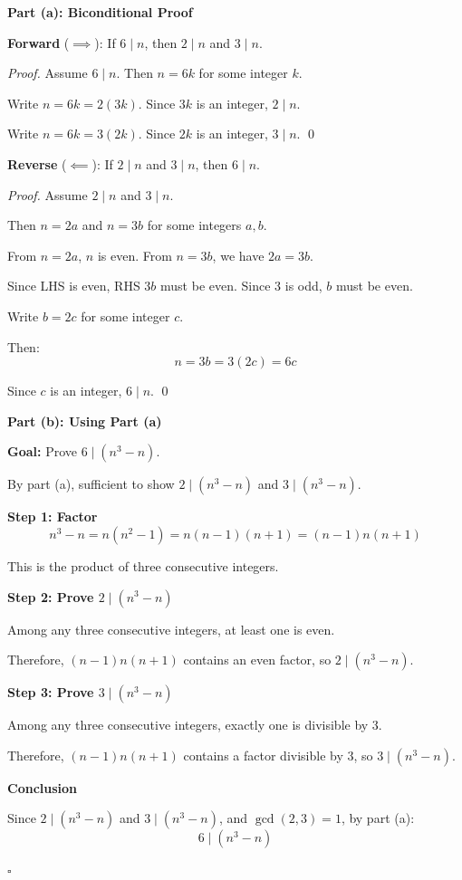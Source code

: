 \begin{solution}
\textbf{Part (a): Biconditional Proof}

\textbf{Forward} ($\implies$): If $6 \mid n$, then $2 \mid n$ and $3 \mid n$.

\begin{proof}
Assume $6 \mid n$. Then $n = 6k$ for some integer $k$.

Write $n = 6k = 2(3k)$. Since $3k$ is an integer, $2 \mid n$.

Write $n = 6k = 3(2k)$. Since $2k$ is an integer, $3 \mid n$. \qed
\end{proof}

\textbf{Reverse} ($\impliedby$): If $2 \mid n$ and $3 \mid n$, then $6 \mid n$.

\begin{proof}
Assume $2 \mid n$ and $3 \mid n$.

Then $n = 2a$ and $n = 3b$ for some integers $a, b$.

From $n = 2a$, $n$ is even. From $n = 3b$, we have $2a = 3b$.

Since LHS is even, RHS $3b$ must be even. Since 3 is odd, $b$ must be even.

Write $b = 2c$ for some integer $c$.

Then:
\[ n = 3b = 3(2c) = 6c \]

Since $c$ is an integer, $6 \mid n$. \qed
\end{proof}

\vspace{1em}
\textbf{Part (b): Using Part (a)}

\textbf{Goal:} Prove $6 \mid (n^3 - n)$.

By part (a), sufficient to show $2 \mid (n^3 - n)$ and $3 \mid (n^3 - n)$.

\textbf{Step 1: Factor}
\[ n^3 - n = n(n^2 - 1) = n(n-1)(n+1) = (n-1)n(n+1) \]

This is the product of three consecutive integers.

\textbf{Step 2: Prove $2 \mid (n^3 - n)$}

Among any three consecutive integers, at least one is even.

Therefore, $(n-1)n(n+1)$ contains an even factor, so $2 \mid (n^3 - n)$. \checkmark

\textbf{Step 3: Prove $3 \mid (n^3 - n)$}

Among any three consecutive integers, exactly one is divisible by 3.

Therefore, $(n-1)n(n+1)$ contains a factor divisible by 3, so $3 \mid (n^3 - n)$. \checkmark

\textbf{Conclusion}

Since $2 \mid (n^3 - n)$ and $3 \mid (n^3 - n)$, and $\gcd(2,3) = 1$, by part (a):
\[ 6 \mid (n^3 - n) \]

\hfill $\square$
\end{solution}

